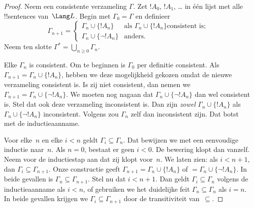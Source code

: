 \documentclass[openany]{memoir}
\begin{document}
\begin{proof}
Neem een consistente verzameling $\Gamma$. Zet $!A_0$, $!A_1$,
\dots{} in één lijst met alle !!{sentence}s van~$\Lang L$. Begin met
$\Gamma_0 = \Gamma$ en definieer
\[
\Gamma_{n+1} =
\begin{cases}
\Gamma_n \cup \{ !A_n \} & \textrm{als $\Gamma_n \cup \{!A_n\}$
  consistent is;} \\
\Gamma_n \cup \{ \lnot !A_n \} & \textrm{anders.}
\end{cases}
\]
Neem ten slotte $\Gamma^* = \bigcup_{n \geq 0} \Gamma_n$.

Elke $\Gamma_n$ is consistent. Om te beginnen is $\Gamma_0$ per
definitie consistent. Als $\Gamma_{n+1} = \Gamma_n \cup \{!A_n\}$,
hebben we deze mogelijkheid gekozen omdat de nieuwe verzameling
consistent is. Is zij niet consistent, dan nemen we
$\Gamma_{n+1} = \Gamma_n \cup \{\lnot !A_n\}$. We moeten nog nagaan dat
$\Gamma_n \cup \{\lnot !A_n\}$ dan wel consistent is. Stel dat ook deze
verzameling inconsistent is. Dan zijn \emph{zowel}
$\Gamma_n \cup \{!A_n\}$ als $\Gamma_n \cup \{\lnot !A_n\}$
inconsistent. Volgens
zou $\Gamma_n$ zelf dan inconsistent zijn. Dat botst met de
inductieaanname.

Voor elke~$n$ en elke $i < n$ geldt $\Gamma_i \subseteq \Gamma_n$. Dat
bewijzen we met een eenvoudige inductie naar~$n$. Als $n=0$, bestaat er
geen $i < 0$. De bewering klopt dan vanzelf. Neem voor de inductiestap
aan dat zij klopt voor~$n$. We laten zien: als $i < n+1$, dan
$\Gamma_i \subseteq \Gamma_{n+1}$. Onze constructie geeft
$\Gamma_{n+1} = \Gamma_n \cup \{!A_n\}$ of $= \Gamma_n \cup \{\lnot
!A_n\}$. In beide gevallen is $\Gamma_n \subseteq \Gamma_{n+1}$. Stel
nu dat $i < n+1$. Dan geldt $\Gamma_i \subseteq \Gamma_n$ volgens de
inductieaanname als $i < n$, of gebruiken we het duidelijke feit
$\Gamma_n \subseteq \Gamma_n$ als $i = n$. In beide gevallen
krijgen we $\Gamma_i \subseteq \Gamma_{n+1}$ door de transitiviteit
van~$\subseteq$.


\end{proof}
\end{document}
